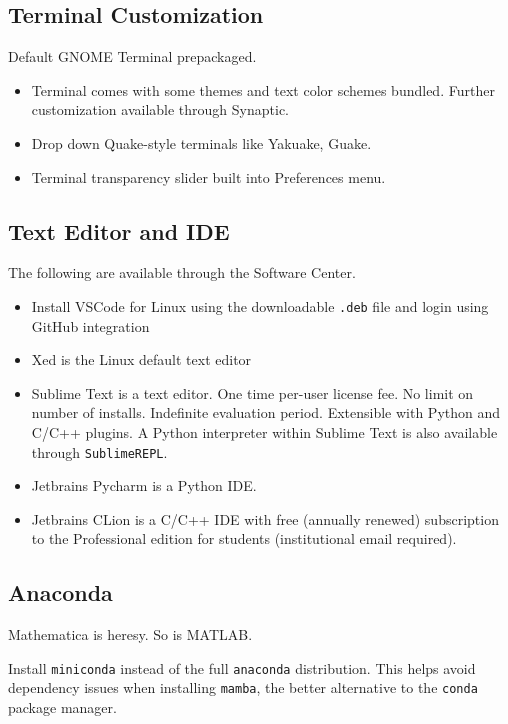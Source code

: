 \documentclass[8pt,letterpaper,twocolumn]{article}
\begin{document}
\subsection{Terminal Customization}

Default GNOME Terminal prepackaged.

\begin{itemize}
	\item Terminal comes with some themes and text color schemes bundled. Further customization available through Synaptic.
	\item Drop down Quake-style terminals like Yakuake, Guake.
	\item Terminal transparency slider built into Preferences menu.
\end{itemize}

\subsection{Text Editor and IDE}
The following are available through the Software Center.

\begin{itemize}
	\item Install VSCode for Linux using the downloadable \texttt{.deb} file and login using GitHub integration
	\item Xed is the Linux default text editor
	\item Sublime Text is a text editor. One time per-user license fee. No limit on number of installs. Indefinite evaluation period. Extensible with Python and C/C++ plugins. A Python interpreter within Sublime Text is also available through \texttt{SublimeREPL}.
	\item Jetbrains Pycharm is a Python IDE.
	\item Jetbrains CLion is a C/C++ IDE with free (annually renewed) subscription to the Professional edition for students (institutional email required).
\end{itemize}

\subsection{Anaconda}

Mathematica is heresy. So is MATLAB.

Install \texttt{miniconda} instead of the full \texttt{anaconda} distribution.
This helps avoid dependency issues when installing \texttt{mamba}, the better alternative to the
\texttt{conda} package manager.
\end{document}
